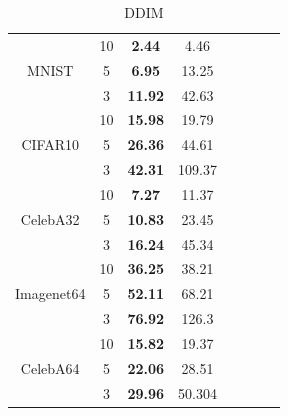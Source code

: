 \documentclass{article}
\begin{document}
\begin{table}
\begin{subtable}[t]{0.328\textwidth}
{\begin{tabular}{cccccccc}
        \midrule
        \multirow{3}{*}{MNIST} &10   &\textbf{2.44} &4.46  \\
        & 5 &\textbf{6.95}  &13.25   \\
        & 3 &\textbf{11.92}  &42.63  \\
        \midrule
        \multirow{3}{*}{CIFAR10} & 10  &\textbf{15.98}  &19.79 \\
        & 5 &\textbf{26.36}  &44.61   \\
        & 3  &\textbf{42.31} &109.37  \\
        \midrule
        \multirow{3}{*}{CelebA32} & 10 &\textbf{7.27} &11.37 \\
        & 5 &\textbf{10.83} &23.45  \\
        & 3 & \textbf{16.24} &45.34 \\
        \midrule
        \multirow{3}{*}{Imagenet64} & 10  &\textbf{36.25}  &38.21 \\
        & 5 &\textbf{52.11}  &68.21  \\
        & 3  &\textbf{76.92}  &126.3  \\
        \midrule
        \multirow{3}{*}{CelebA64} & 10  &\textbf{15.82}  &19.37   \\
        & 5  &\textbf{22.06}  &28.51   \\
        & 3  &\textbf{29.96} &50.304   \\
        \hline
        \bottomrule
        \end{tabular}
    }
    \caption{DDIM}
    \label{tab:results_ddim}
    \end{subtable}%
    \begin{subtable}[t]{0.336\textwidth}
    \centering
\end{subtable}
\end{table}
\end{document}
